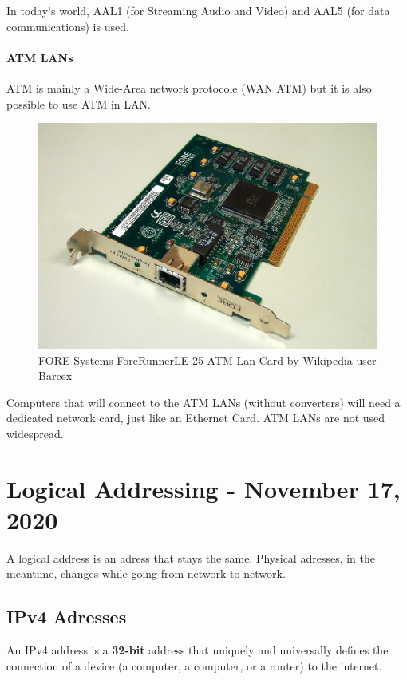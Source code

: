 \documentclass[11pt,a4paper,twoside]{book}
\begin{document}
In today's world, AAL1 (for Streaming Audio and Video) and AAL5 (for data communications) is used.\\

\subsubsection{ATM LANs}

ATM is mainly a Wide-Area network protocole (WAN ATM) but it is also possible to use ATM in LAN.

\begin{figure}[httb]
\centering
\includegraphics{atmcard.jpeg}
\caption{FORE Systems ForeRunnerLE 25 ATM Lan Card by Wikipedia user Barcex}
\end{figure}

Computers that will connect to the ATM LANs (without converters) will need a dedicated network card, just like an Ethernet Card. ATM LANs are not used widespread.

\chapter{Logical Addressing - November 17, 2020}

A logical address is an adress that stays the same. Physical adresses, in the meantime, changes while going from network to network.

\section{IPv4 Adresses}

An IPv4 address is a \textbf{32-bit} address that uniquely and universally defines the connection of a device (a computer, a computer, or a router) to the internet.
\end{document}
